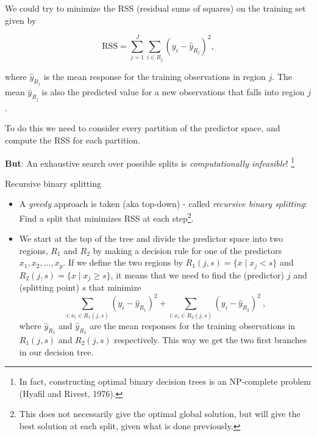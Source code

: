 \documentclass[10pt,ignorenonframetext,]{beamer}
\begin{document}
\begin{frame}

We could try to minimize the RSS (residual sums of squares) on the
training set given by

\[
\text{RSS}=\sum_{j=1}^J \sum_{i \in R_j}(y_i-\hat{y}_{R_j})^2,
\]

where \(\hat{y}_{R_j}\) is the mean response for the training
observations in region \(j\). The mean \(\hat{y}_{R_j}\) is also the
predicted value for a new observations that falls into region \(j\).

To do this we need to consider every partition of the predictor space,
and compute the RSS for each partition.

\textbf{But}: An exhaustive search over possible splits is
\emph{computationally infeasible}!
\footnote{In fact, constructing optimal binary decision trees is an NP-complete problem (Hyafil and Rivest, 1976).}

\end{frame}

\begin{frame}

\begin{block}{Recursive binary splitting}

\vspace{2mm}

\begin{itemize}
\item
  A \emph{greedy} approach is taken (aka top-down) - called
  \emph{recursive binary splitting}: Find a split that minimizes RSS at
  each
  step\footnote{This does not necessarily give the optimal global solution, but will give the best solution at each split, given what is done previously.}.
\item
  We start at the top of the tree and divide the predictor space into
  two regions, \(R_1\) and \(R_2\) by making a decision rule for one of
  the predictors \(x_1, x_2,...,x_p\). If we define the two regions by
  \(R_1(j,s)=\{x \mid x_j<s\}\) and \(R_2(j,s)=\{x \mid x_j\geq s\}\),
  it means that we need to find the (predictor) \(j\) and (splitting
  point) \(s\) that minimize
  \[\sum_{i: x_i \in R_1(j,s)}(y_i-\hat{y}_{R_1})^2+\sum_{i: x_i \in R_2(j,s)}(y_i -\hat{y}_{R_2})^2 \ ,\]
  where \(\hat{y}_{R_1}\) and \(\hat{y}_{R_2}\) are the mean responses
  for the training observations in \(R_1(j,s)\) and \(R_2(j,s)\)
  respectively. This way we get the two first branches in our decision
  tree.
\end{itemize}

\end{block}

\end{frame}
\end{document}
